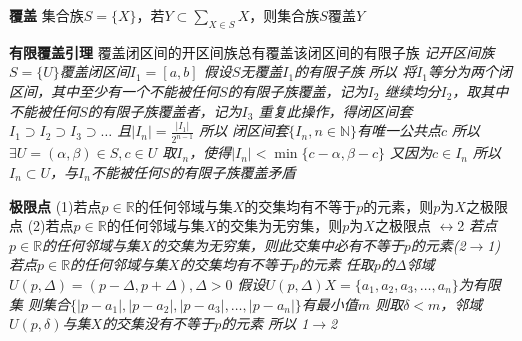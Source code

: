 \documentclass[11pt]{article}
\begin{document}
\textbf{覆盖}
\newline
集合族$S=\{X\}$，若$Y\subset\sum\limits_{X\in S}X$，则集合族$S$覆盖$Y$
\newline

\textbf{有限覆盖引理}
\newline
覆盖闭区间的开区间族总有覆盖该闭区间的有限子族
\newline
\textit{记开区间族$S=\{U\}$覆盖闭区间$I_1=[a,b]$
\newline
假设$S$无覆盖$I_1$的有限子族
\newline
所以 将$I_1$等分为两个闭区间，其中至少有一个不能被任何$S$的有限子族覆盖，记为$I_2$
\newline
继续均分$I_2$，取其中不能被任何$S$的有限子族覆盖者，记为$I_3$
\newline
重复此操作，得闭区间套$I_1\supset I_2\supset I_3\supset\dots$
\newline
且$|I_n|=\frac{|I_1|}{2^{n-1}}$
\newline
所以 闭区间套$\{I_n,n\in\mathbb{N}\}$有唯一公共点$c$
\newline
所以$\exists U=(\alpha,\beta)\in S, c\in U$
\newline
取$I_n$，使得$|I_n|<\min\{c-\alpha,\beta-c\}$
\newline
又因为$ c\in I_n$
\newline
所以$I_n\subset U$，与$I_n$不能被任何$S$的有限子族覆盖矛盾}
\newline

\textbf{极限点}
\newline
(1)若点$p\in\mathbb{R}$的任何邻域与集$X$的交集均有不等于$p$的元素，则$p$为$X$之极限点
\newline
(2)若点$p\in\mathbb{R}$的任何邻域与集$X$的交集为无穷集，则$p$为$X$之极限点
$\longleftrightarrow$2
\newline
\textit{若点$p\in\mathbb{R}$的任何邻域与集$X$的交集为无穷集，则此交集中必有不等于$p$的元素(2$\rightarrow$1)
\newline
若点$p\in\mathbb{R}$的任何邻域与集$X$的交集均有不等于$p$的元素
\newline
任取$p$的$\Delta$邻域$U(p,\Delta)=(p-\Delta,p+\Delta), \Delta>0$
\newline
假设$U(p,\Delta)X=\{a_1,a_2,a_3,\dots,a_n\}$为有限集
\newline
则集合$\{|p-a_1|,|p-a_2|,|p-a_3|,\dots,|p-a_n|\}$有最小值$m$
\newline
则取$\delta<m$，邻域$U(p,\delta)$与集$X$的交集没有不等于$p$的元素
\newline
所以 1$\rightarrow$2}
\newline
\end{document}
